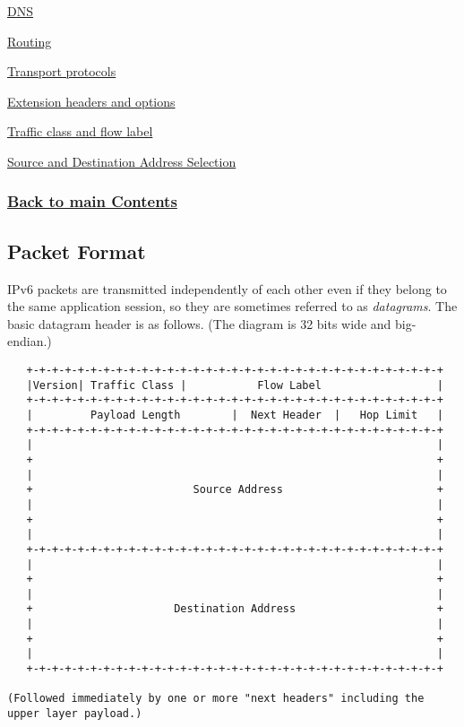 \documentclass[
]{article}
\begin{document}
\hyperref[dns]{DNS}

\hyperref[routing]{Routing}

\hyperref[transport-protocols]{Transport protocols}

\hyperref[extension-headers-and-options]{Extension headers and options}

\hyperref[traffic-class-and-flow-label]{Traffic class and flow label}

\hyperref[source-and-destination-address-selection]{Source and
Destination Address Selection}

\subsubsection{\texorpdfstring{\hyperref[list-of-contents]{Back to main
Contents}}{Back to main Contents}}\label{back-to-main-contents-1}

\pagebreak

\subsection{Packet Format}\label{packet-format}

IPv6 packets are transmitted independently of each other even if they
belong to the same application session, so they are sometimes referred
to as \emph{datagrams}. The basic datagram header is as follows. (The
diagram is 32 bits wide and big-endian.)

\begin{verbatim}
   +-+-+-+-+-+-+-+-+-+-+-+-+-+-+-+-+-+-+-+-+-+-+-+-+-+-+-+-+-+-+-+-+
   |Version| Traffic Class |           Flow Label                  |
   +-+-+-+-+-+-+-+-+-+-+-+-+-+-+-+-+-+-+-+-+-+-+-+-+-+-+-+-+-+-+-+-+
   |         Payload Length        |  Next Header  |   Hop Limit   |
   +-+-+-+-+-+-+-+-+-+-+-+-+-+-+-+-+-+-+-+-+-+-+-+-+-+-+-+-+-+-+-+-+
   |                                                               |
   +                                                               +
   |                                                               |
   +                         Source Address                        +
   |                                                               |
   +                                                               +
   |                                                               |
   +-+-+-+-+-+-+-+-+-+-+-+-+-+-+-+-+-+-+-+-+-+-+-+-+-+-+-+-+-+-+-+-+
   |                                                               |
   +                                                               +
   |                                                               |
   +                      Destination Address                      +
   |                                                               |
   +                                                               +
   |                                                               |
   +-+-+-+-+-+-+-+-+-+-+-+-+-+-+-+-+-+-+-+-+-+-+-+-+-+-+-+-+-+-+-+-+

(Followed immediately by one or more "next headers" including the
upper layer payload.)
\end{verbatim}
\end{document}
